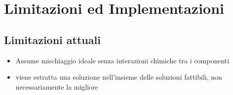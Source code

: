\documentclass{article}
\begin{document}
\section{Limitazioni ed Implementazioni}

\subsection{Limitazioni attuali}
\begin{itemize}
    \item Assume mischiaggio ideale senza interazioni chimiche tra i componenti
    \item viene estratta una soluzione nell'insieme delle soluzioni fattibili, non necessariamente la migliore
\end{itemize}
\end{document}
